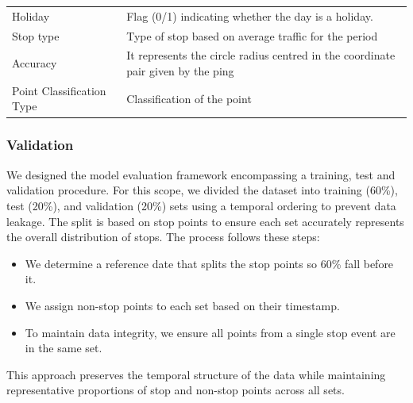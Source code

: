 \documentclass{article}
\begin{document}
\begin{table}
\begin{scriptsize}
\begin{tabular}{ll}
		Holiday     & Flag (0/1) indicating whether the day is a holiday.  \\
	  Stop type     & Type of stop based on average traffic for the period  \\
	  Accuracy     &  It represents the circle radius centred in the coordinate pair given by the ping \\
	  Point Classification Type     & Classification of the point\\
		\bottomrule
	\end{tabular}
	\label{tab:feature}
 
 \end{scriptsize}
\end{table}




\subsubsection{Validation}
We designed the model evaluation framework encompassing a training, test and validation procedure. For this scope, we divided the dataset into training (60\%), test (20\%), and validation (20\%) sets using a temporal ordering to prevent data leakage. The split is based on stop points to ensure each set accurately represents the overall distribution of stops.
The process follows these steps:

\begin{itemize}
    \item We determine a reference date that splits the stop points so 60\% fall before it.
    \item We assign non-stop points to each set based on their timestamp.
    \item To maintain data integrity, we ensure all points from a single stop event are in the same set.    
\end{itemize}

This approach preserves the temporal structure of the data while maintaining representative proportions of stop and non-stop points across all sets.
\end{document}
